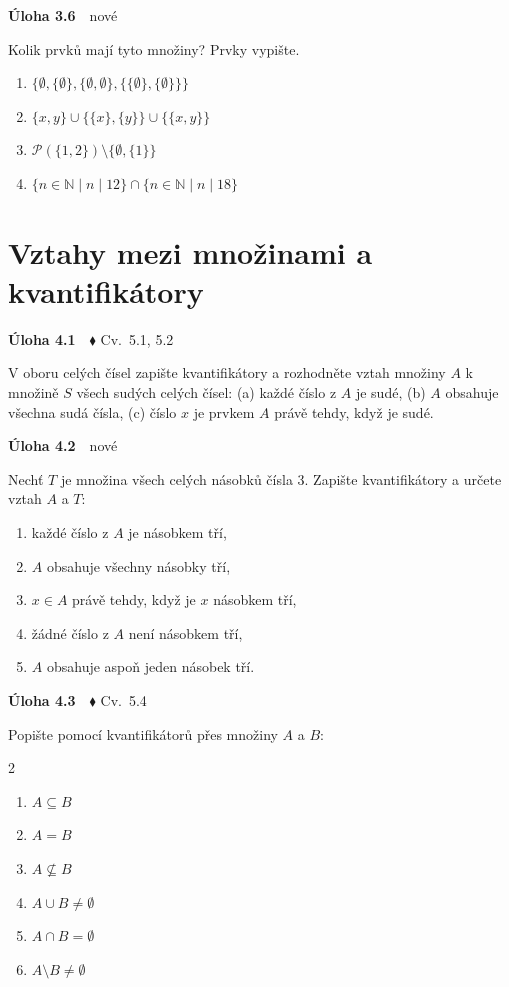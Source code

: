 \documentclass[11pt,a4paper]{article}
\newcommand{\N}{\mathbb N}\newcommand{\Z}{\mathbb Z}\newcommand{\Pot}{\mathcal P}
\newcommand{\pr}{\mathrel{\mid}}\newcommand{\nepr}{\mathrel{\nmid}}\newcommand{\sm}{\setminus}
\newenvironment{pol}{\begin{enumerate}[label=(\alph*),leftmargin=2em,itemsep=3pt]}{\end{enumerate}}
\newenvironment{dvasl}{\begin{multicols}{2}\begin{enumerate}[label=(\alph*),leftmargin=2em,itemsep=3pt]}{\end{enumerate}\end{multicols}}
\newenvironment{uloha}[2]{\Needspace{6\baselineskip}\par\vspace{6pt}\noindent\textbf{Úloha #1}\ \ {\footnotesize\color{gray}#2}\par\vspace{2pt}}{\par\vspace{4pt}}
\begin{document}
\begin{uloha}{3.6}{nové}
Kolik prvků mají tyto množiny? Prvky vypište.
\begin{pol}
  \item $\{\emptyset,\{\emptyset\},\{\emptyset,\emptyset\},\{\{\emptyset\},\{\emptyset\}\}\}$
  \item $\{x,y\}\cup\{\{x\},\{y\}\}\cup\{\{x,y\}\}$
  \item $\mathcal P(\{1,2\})\sm\{\emptyset,\{1\}\}$
  \item $\{n\in\N\mid n\pr12\}\cap\{n\in\N\mid n\pr18\}$
\end{pol}

\end{uloha}

\section{Vztahy mezi množinami a kvantifikátory}

\begin{uloha}{4.1}{$\blacklozenge$ Cv.~5.1, 5.2}
V oboru celých čísel zapište kvantifikátory a rozhodněte vztah množiny $A$ k množině $S$ všech sudých celých čísel: (a) každé číslo z $A$ je sudé, (b) $A$ obsahuje všechna sudá čísla, (c) číslo $x$ je prvkem $A$ právě tehdy, když je sudé.

\end{uloha}

\begin{uloha}{4.2}{nové}
Nechť $T$ je množina všech celých násobků čísla $3$. Zapište kvantifikátory a určete vztah $A$ a $T$:
\begin{pol}
  \item každé číslo z $A$ je násobkem tří,
  \item $A$ obsahuje všechny násobky tří,
  \item $x\in A$ právě tehdy, když je $x$ násobkem tří,
  \item žádné číslo z $A$ není násobkem tří,
  \item $A$ obsahuje aspoň jeden násobek tří.
\end{pol}

\end{uloha}

\begin{uloha}{4.3}{$\blacklozenge$ Cv.~5.4}
Popište pomocí kvantifikátorů přes množiny $A$ a $B$:
\begin{dvasl}
  \item $A\subseteq B$
  \item $A=B$
  \item $A\nsubseteq B$
  \item $A\cup B\neq\emptyset$
  \item $A\cap B=\emptyset$
  \item $A\sm B\neq\emptyset$
\end{dvasl}

\end{uloha}
\end{document}
